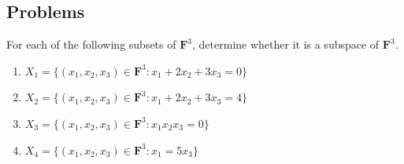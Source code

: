\subsection{Problems}

\begin{exercise}
For each of the following subsets of $\mathbf{F}^3$, determine whether it is a subspace of $\mathbf{F}^3$.
\begin{enumerate}
\item[(a)] $X_1=\{(x_1, x_2, x_3) \in \mathbf{F}^3 : x_1 + 2x_2 + 3x_3 = 0\}$
\item[(b)] $X_2=\{(x_1, x_2, x_3) \in \mathbf{F}^3 : x_1 + 2x_2 + 3x_3 = 4\}$
\item[(c)] $X_3=\{(x_1, x_2, x_3) \in \mathbf{F}^3 : x_1x_2x_3 = 0\}$
\item[(d)] $X_4=\{(x_1, x_2, x_3) \in \mathbf{F}^3 : x_1 = 5x_3\}$
\end{enumerate}
\end{exercise}

